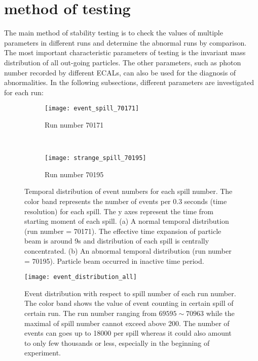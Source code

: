 \section{method of testing}
The main method of stability testing is to check the values of multiple parameters in different runs and determine the abnormal runs by comparison. The most important characteristic parameters of testing is the invariant mass distribution of all out-going particles. The other parameters, such as photon number recorded by different ECALs, can also be used for the diagnosis of abnormalities. In the following subsections, different parameters are investigated for each run:

\begin{figure*}[!ht]
	\centering
	\begin{subfigure}[b]{0.49\textwidth}
		\texttt{[image: event\_spill\_70171]}
		\caption{Run number 70171}
		\label{fig:EveN_spill_normal}
	\end{subfigure}
	~ %
	\begin{subfigure}[b]{0.49\textwidth}
		\texttt{[image: strange\_spill\_70195]}
		\caption{Run number 70195}
		\label{fig:EveN_spill_abnormal}
	\end{subfigure}
	\caption{Temporal distribution of event numbers for each spill number. The color band represents the number of events per 0.3 seconds (time resolution) for each spill. The y axes represent the time from starting moment of each spill. (a) A normal temporal distribution (run number = 70171). The effective time expansion of particle beam is around 9s and distribution of each spill is centrally concentrated. (b) An abnormal temporal distribution (run number = 70195). Particle beam occurred in inactive time period.}
	\label{fig:animals}
\end{figure*}

\begin{figure*}[!h]
	\centering
	\texttt{[image: event\_distribution\_all]}
	\caption{Event distribution with respect to spill number of each run number. The color band shows the value of event counting in certain spill of certain run. The run number ranging from $69595 \sim 70963$ while the maximal of spill number cannot exceed above 200. The number of events can goes up to 18000 per spill whereas it could also amount to only few thousands or less, especially in the beginning of experiment. }
	\label{fig:event_distribution_all}
\end{figure*}

